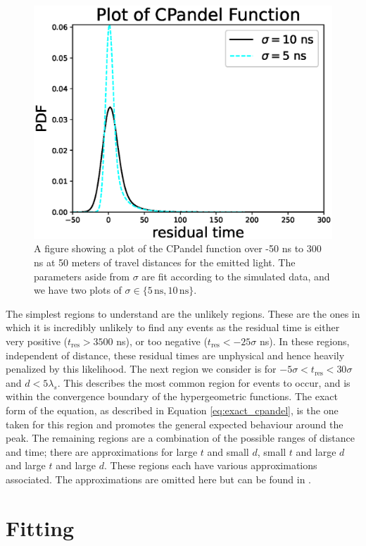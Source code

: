 \begin{figure}[H]
  \centering
  \includegraphics[width=12cm]{./Figures/cpandel_plot.eps}
  \caption{A figure showing a plot of the CPandel function over -50 ns to 300 ns at 50 meters of travel distances for the emitted light. The parameters aside from $\sigma$ are fit according to the simulated data, and we have two plots of $\sigma \in \{5\, \text{ns}, 10\, \text{ns}\}$.}
  \label{fig:cpandel}
\end{figure}

The simplest regions to understand are the unlikely regions. These are the ones in which it is incredibly unlikely to find any events as the residual time is either very positive ($t_{\text{res}} > 3500$ ns), or too negative ($t_{\text{res}} < -25\sigma$ ns). In these regions, independent of distance, these residual times are unphysical and hence heavily penalized by this likelihood. The next region we consider is for $-5\sigma < t_{\text{res}} < 30\sigma$ and $d < 5\lambda_{s}$. This describes the most common region for events to occur, and is within the convergence boundary of the hypergeometric functions. The exact form of the equation, as described in Equation \ref{eq:exact_cpandel}, is the one taken for this region and promotes the general expected behaviour around the peak. The remaining regions are a combination of the possible ranges of distance and time; there are approximations for large $t$ and small $d$, small $t$ and large $d$ and large $t$ and large $d$. These regions each have various approximations associated. The approximations are omitted here but can be found in \cite{conv}.

\section{Fitting}

